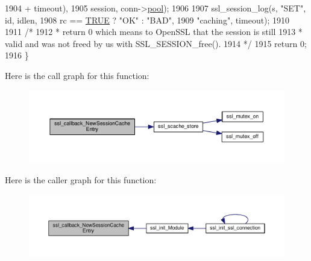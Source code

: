 \begin{DoxyCode}
1904                                           + timeout),
1905                           session, conn->\hyperlink{structconn__rec_a1dc5f31c7afc4a6f9c4ede0daea8cd1d}{pool});
1906 
1907     ssl\_session\_log(s, \textcolor{stringliteral}{"SET"}, \textcolor{keywordtype}{id}, idlen,
1908                     rc == \hyperlink{group__MOD__SSL__PRIVATE_gaa8cecfc5c5c054d2875c03e77b7be15d}{TRUE} ? \textcolor{stringliteral}{"OK"} : \textcolor{stringliteral}{"BAD"},
1909                     \textcolor{stringliteral}{"caching"}, timeout);
1910 
1911     \textcolor{comment}{/*}
1912 \textcolor{comment}{     * return 0 which means to OpenSSL that the session is still}
1913 \textcolor{comment}{     * valid and was not freed by us with SSL\_SESSION\_free().}
1914 \textcolor{comment}{     */}
1915     \textcolor{keywordflow}{return} 0;
1916 \}
\end{DoxyCode}


Here is the call graph for this function\+:
\nopagebreak
\begin{figure}[H]
\begin{center}
\leavevmode
\includegraphics[width=350pt]{group__MOD__SSL__PRIVATE_ga087260c207e89e9016ae47a216d496f4_cgraph}
\end{center}
\end{figure}




Here is the caller graph for this function\+:
\nopagebreak
\begin{figure}[H]
\begin{center}
\leavevmode
\includegraphics[width=350pt]{group__MOD__SSL__PRIVATE_ga087260c207e89e9016ae47a216d496f4_icgraph}
\end{center}
\end{figure}


